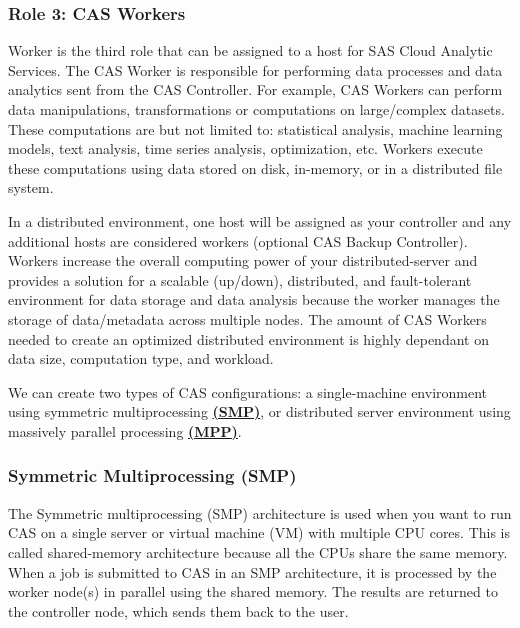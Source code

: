 
\subsubsection{Role 3: CAS Workers}
Worker is the third role that can be assigned to a host for SAS Cloud Analytic Services. The CAS Worker is responsible for performing data processes and data analytics sent from the CAS Controller. For example, CAS Workers can perform data manipulations, transformations or computations on large/complex datasets. These computations are but not limited to: statistical analysis, machine learning models, text analysis, time series analysis, optimization, etc. Workers execute these computations using data stored on disk, in-memory, or in a distributed file system. 

In a distributed environment, one host will be assigned as your controller and any additional hosts are considered workers (optional CAS Backup Controller). Workers increase the overall computing power of your distributed-server and provides a solution for a scalable (up/down), distributed, and fault-tolerant environment for data storage and data analysis because the worker manages the storage of data/metadata across multiple nodes. The amount of CAS Workers needed to create an optimized distributed environment is highly dependant on data size, computation type, and workload.  

We can create two types of CAS configurations: a single-machine environment using symmetric multiprocessing \href{https://documentation.sas.com/doc/en/calcdc/3.3/calserverscas/n05000viyaservers000000admin.htm}{\textbf{(SMP)}}, or distributed server environment using massively parallel processing \href{https://documentation.sas.com/doc/en/calcdc/3.3/calserverscas/n05000viyaservers000000admin.htm}{\textbf{{(MPP)}}}.

\subsubsection{Symmetric Multiprocessing (SMP)}
The Symmetric multiprocessing (SMP) architecture is used when you want to run CAS on a single server or virtual machine (VM) with multiple CPU cores. This is called shared-memory architecture because all the CPUs share the same memory. When a job is submitted to CAS in an SMP architecture, it is processed by the worker node(s) in parallel using the shared memory. The results are returned to the controller node, which sends them back to the user.

